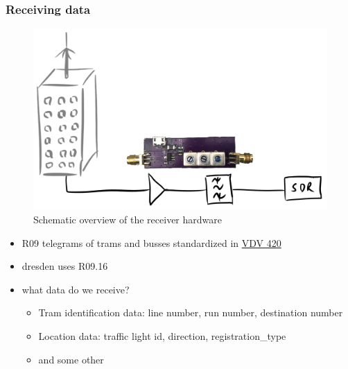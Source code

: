 \documentclass[aspectratio=169]{beamer}
\begin{document}

\begin{frame}
\frametitle{Receiving data}
\begin{figure}
\centering
\includegraphics[height=0.65\textheight]{figs/antenna-filter.pdf}
\caption{Schematic overview of the receiver hardware}
\end{figure}
\end{frame}


\begin{frame}
	\begin{itemize}
		\item R09 telegrams of trams and busses standardized in \href{https://knowhow.vdv.de/documents/420/}{VDV 420}
		\item dresden uses R09.16
		\item what data do we receive?
		\begin{itemize}
			\item Tram identification data: line number, run number, destination number
			\item Location data: traffic light id, direction, registration\_type
			\item and some other
		\end{itemize}
	\end{itemize}
\end{frame}

\end{document}
